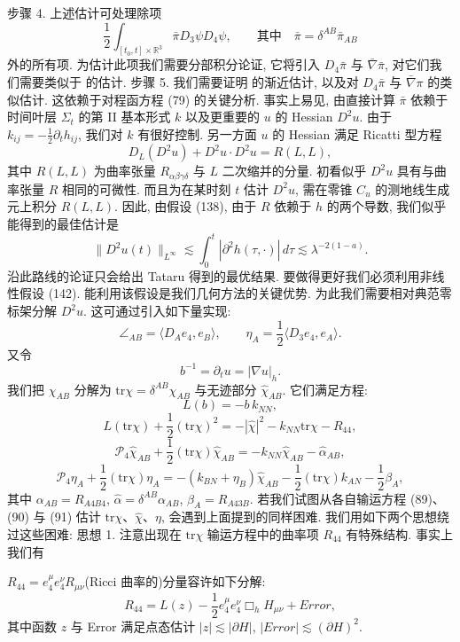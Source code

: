 步骤 4. 上述估计可处理除项
\[
\frac{1}{2}\int_{[t_{0},t]\times\mathbb{R}^{3}}\bar{\pi}D_{3}\psi D_{4}\psi,\qquad\text{其中}\quad \bar{\pi}=\delta^{A B}\bar{\pi}_{A B}
\]
外的所有项. 为估计此项我们需要分部积分论证, 它将引入 $D_4\bar{\pi}$ 与 $\bar{\nabla}\bar{\pi}$, 对它们我们需要类似于 的估计.
步骤 5. 我们需要证明 的渐近估计, 以及对 $D_4\bar{\pi}$ 与 $\bar{\nabla}\pi$ 的类似估计. 这依赖于对程函方程 (79) 的关键分析. 事实上易见, 由直接计算 $\bar{\pi}$ 依赖于时间叶层 $\Sigma_t$ 的第 II 基本形式 $k$ 以及更重要的 $u$ 的 Hessian $D^2u$. 由于 $k_{ij} = -\frac{1}{2}\partial_t h_{ij}$, 我们对 $k$ 有很好控制. 另一方面 $u$ 的 Hessian 满足 Ricatti 型方程
\[
D_{L}(D^{2}u)+D^{2}u\cdot D^{2}u=R(L,L),
\]
其中 $R(L,L)$ 为曲率张量 $R_{\alpha\beta\gamma\delta}$ 与 $L$ 二次缩并的分量. 初看似乎 $D^{2}u$ 具有与曲率张量 $R$ 相同的可微性. 而且为在某时刻 $t$ 估计 $D^{2}u$, 需在零锥 $C_{u}$ 的测地线生成元上积分 $R(L,L)$. 因此, 由假设 (138), 由于 $R$ 依赖于 $h$ 的两个导数, 我们似乎能得到的最佳估计是
\[
\|D^{2}u(t)\|_{L^{\infty}}
\lesssim\int_{0}^{t}|\partial^{2}h(\tau,\cdot)|\,d\tau
\lesssim\lambda^{-2(1-a)}.
\]
沿此路线的论证只会给出 Tataru 得到的最优结果. 要做得更好我们必须利用非线性假设 (142). 能利用该假设是我们几何方法的关键优势.
为此我们需要相对典范零标架分解 $D^{2}u$. 这可通过引入如下量实现:
\[
\angle_{A B}=\langle D_{A}e_{4},e_{B}\rangle,\qquad \eta_{A}=\frac{1}{2}\langle D_{3}e_{4},e_{A}\rangle.
\]
又令
\[
b^{-1}=\partial_{t}u=|\nabla u|_{h}.
\]
我们把 $\chi_{AB}$ 分解为 $\mathrm{tr}\chi = \delta^{AB}\chi_{AB}$ 与无迹部分 $\hat{\chi}_{AB}$. 它们满足方程:
\[
L(b)=-b\, k_{N N},
\]
\[
L(\mathrm{tr}\chi)+\frac{1}{2}(\mathrm{tr}\chi)^{2}=-|\hat{\chi}|^{2}-k_{N N}\mathrm{tr}\chi-R_{44},
\]
\[
\mathcal{P}_{4}\hat{\chi}_{A B}+\frac{1}{2}(\mathrm{tr}\chi)\hat{\chi}_{A B}=-k_{N N}\hat{\chi}_{A B}-\hat{\alpha}_{A B},
\]
\[
\mathcal{P}_{4}\eta_{A}+\frac{1}{2}(\mathrm{tr}\chi)\eta_{A}=-(k_{B N}+\eta_{B})\hat{\chi}_{A B}-\frac{1}{2}(\mathrm{tr}\chi)k_{A N}-\frac{1}{2}\beta_{A},
\]
其中 $\alpha_{AB} = R_{A4B4}$, $\hat{\alpha} = \delta^{AB} \alpha_{AB}$, $\beta_{A} = R_{A43B}$. 若我们试图从各自输运方程 (89)、(90) 与 (91) 估计 $\mathrm{tr}\chi$、$\hat{\chi}$、$\eta$, 会遇到上面提到的同样困难. 我们用如下两个思想绕过这些困难:
思想 1. 注意出现在 $\mathrm{tr}\chi$ 输运方程中的曲率项 $R_{44}$ 有特殊结构. 事实上我们有

\setcounter{mtthm}{18}
\begin{lemma}[显著分解]\label{lem:3.19}
$R_{44} = e_4^\mu e_4^\nu R_{\mu\nu}$(Ricci 曲率的)分量容许如下分解:
\[
R_{44}=L(z)-\frac{1}{2}e_{4}^{\mu}e_{4}^{\nu}\Box_{h}H_{\mu\nu}+Error,
\]
其中函数 $z$ 与 Error 满足点态估计 $|z| \lesssim |\partial H|$, $|Error| \lesssim (\partial H)^2$.\end{lemma}


